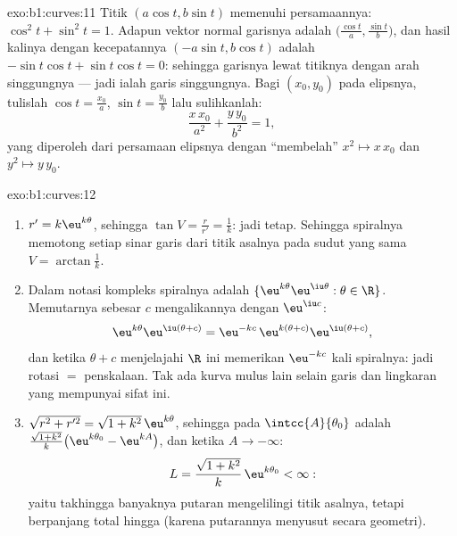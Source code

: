\begin{solution}{exo:b1:curves:11}
Titik $(a\cos t, b\sin t)$ memenuhi persamaannya:
$\cos^2 t + \sin^2 t = 1$. Adapun vektor normal garisnya adalah
$\bigl(\frac{\cos t}a, \frac{\sin t}b\bigr)$, dan hasil kalinya
dengan kecepatannya $(-a\sin t, b\cos t)$ adalah $-\sin t\cos t +
\sin t\cos t = 0$: sehingga garisnya lewat titiknya dengan
arah singgungnya --- jadi ialah garis singgungnya. Bagi $(x_0, y_0)$ pada
elipsnya, tulislah $\cos t = \frac{x_0}a$, $\sin t = \frac{y_0}b$ lalu
sulihkanlah:
\[
\frac{x\,x_0}{a^2} + \frac{y\,y_0}{b^2} = 1 ,
\]
yang diperoleh dari persamaan elipsnya dengan ``membelah'' $x^2 \mapsto
x\,x_0$ dan $y^2 \mapsto y\,y_0$.
\end{solution}

\begin{solution}{exo:b1:curves:12}
\begin{enumerate}
  \item $r' = k\eu^{k\theta}$, sehingga $\tan V = \frac{r}{r'} =
        \frac1k$: jadi tetap. Sehingga spiralnya memotong setiap sinar garis dari
        titik asalnya pada sudut yang sama $V = \arctan\frac1k$.
  \item Dalam notasi kompleks spiralnya adalah $\{\eu^{k\theta}
        \eu^{\iu\theta} : \theta \in \R\}$. Memutarnya sebesar $c$
        mengalikannya dengan $\eu^{\iu c}$:
        \[
        \eu^{k\theta}\eu^{\iu(\theta + c)}
        = \eu^{-kc}\,\eu^{k(\theta + c)}\eu^{\iu(\theta+c)} ,
        \]
        dan ketika $\theta + c$ menjelajahi $\R$ ini memerikan
        $\eu^{-kc}$ kali spiralnya: jadi rotasi $=$ penskalaan. Tak ada
        kurva mulus lain selain garis dan lingkaran yang mempunyai
        sifat ini.
  \item $\sqrt{r^2 + r'^2} = \sqrt{1 + k^2}\,\eu^{k\theta}$, sehingga
        pada $\intcc{A}{\theta_0}$  adalah
        $\frac{\sqrt{1+k^2}}{k}\bigl(\eu^{k\theta_0} -
        \eu^{kA}\bigr)$, dan ketika $A \to -\infty$:
        \[
        L = \frac{\sqrt{1 + k^2}}{k}\,\eu^{k\theta_0} < \infty :
        \]
        yaitu takhingga banyaknya putaran mengelilingi titik asalnya, tetapi berpanjang
        total hingga (karena putarannya menyusut secara geometri).
\end{enumerate}
\end{solution}

